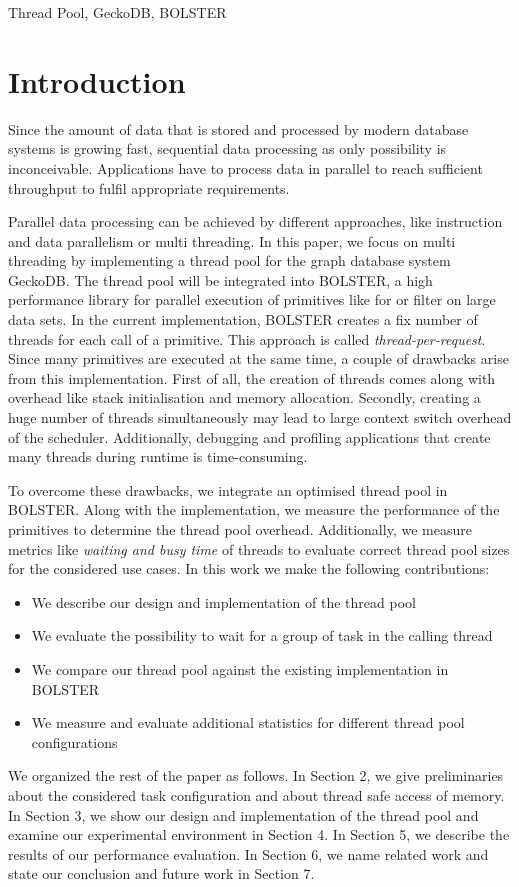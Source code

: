 \documentclass[conference]{IEEEtran}
\begin{document}
\begin{IEEEkeywords}
Thread Pool, GeckoDB, BOLSTER
\end{IEEEkeywords}

\section{Introduction}
Since the amount of data that is stored and processed by modern database systems is growing fast, sequential data processing as only possibility is inconceivable. Applications have to process data in parallel to reach sufficient throughput to fulfil appropriate requirements.

Parallel data processing can be achieved by different approaches, like instruction and data parallelism or multi threading. In this paper, we focus on multi threading by implementing a thread pool for the graph database system GeckoDB. The thread pool will be integrated into BOLSTER, a high performance library for parallel execution of primitives like for or filter on large data sets. In the current implementation, BOLSTER creates a fix number of threads for each call of a primitive. This approach is called \emph{thread-per-request}. Since many primitives are executed at the same time, a couple of drawbacks arise from this implementation.
First of all, the creation of threads comes along with overhead like stack initialisation and memory allocation. Secondly, creating a huge number of threads simultaneously may lead to large context switch overhead of the scheduler. Additionally, debugging and profiling applications that create many threads during runtime is 	time-consuming.

To overcome these drawbacks, we integrate an optimised thread pool in BOLSTER. Along with the implementation, we measure the performance of the primitives to determine the thread pool overhead. Additionally, we measure metrics like \emph{waiting and busy time} of threads to evaluate correct thread pool sizes for the considered use cases. In this work we make the following contributions:
\begin{itemize}
	\item We describe our design and implementation of the thread pool
	\item We evaluate the possibility to wait for a group of task in the calling thread
	\item We compare our thread pool against the existing implementation in BOLSTER
	\item We measure and evaluate additional statistics for different thread pool configurations
\end{itemize}
We organized the rest of the paper as follows. In Section 2, we give preliminaries about the considered task configuration and about thread safe access of memory. In Section 3, we show our design and implementation of the thread pool and examine our experimental environment in Section 4. In Section 5, we describe the results of our performance evaluation. In Section 6, we name related work and state our conclusion and future work in Section 7.
\end{document}
